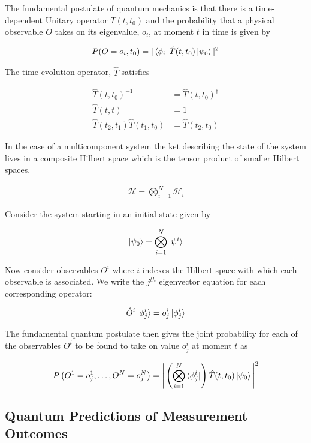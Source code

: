 \documentclass[12pt]{article}
\begin{document}
The fundamental postulate of quantum mechanics is that there is a time-dependent Unitary operator $T(t,t_0)$ and the probability that a physical observable $O$ takes on its eigenvalue, $o_i$, at moment $t$ in time is given by

\begin{align}
P(O=o_i, t_0) = |\bra{\phi_i} \hat{T}(t,t_0) \ket{\psi_0}|^2
\end{align}

The time evolution operator, $\hat{T}$ satisfies

\begin{align}
\hat{T}(t,t_0)^{-1} &= \hat{T}(t,t_0)^{\dag}\\
\hat{T}(t,t) &= 1\\
\hat{T}(t_2,t_1)\hat{T}(t_1,t_0) &= \hat{T}(t_2,t_0)
\end{align}

In the case of a multicomponent system the ket describing the state of the system lives in a composite Hilbert space which is the tensor product of smaller Hilbert spaces.

\begin{align}
\mathcal{H} = \bigotimes_{i=1}^N \mathcal{H}_i
\end{align}

Consider the system starting in an initial state given by

\begin{align}
\ket{\psi_0} = \bigotimes_{i=1}^N \ket{\psi^i}
\end{align}

Now consider observables $O^i$ where $i$ indexes the Hilbert space with which each observable is associated. We write the $j^{th}$ eigenvector equation for each corresponding operator:

\begin{align}
\hat{O}^i \ket{\phi^i_j} = o^i_j \ket{\phi^i_j}
\end{align}

The fundamental quantum postulate then gives the joint probability for each of the observables $O^i$ to be found to take on value $o^i_j$ at moment $t$ as

\begin{align}
P\left(O^1=o^1_j, \ldots, O^N = o^N_j\right) = \Bigg\lvert\left(\bigotimes_{i=1}^N \bra{\phi^i_j} \right) \hat{T}(t,t_0) \ket{\psi_0}\Bigg\rvert^2
\end{align}


\subsection{Quantum Predictions of Measurement Outcomes}
\end{document}
